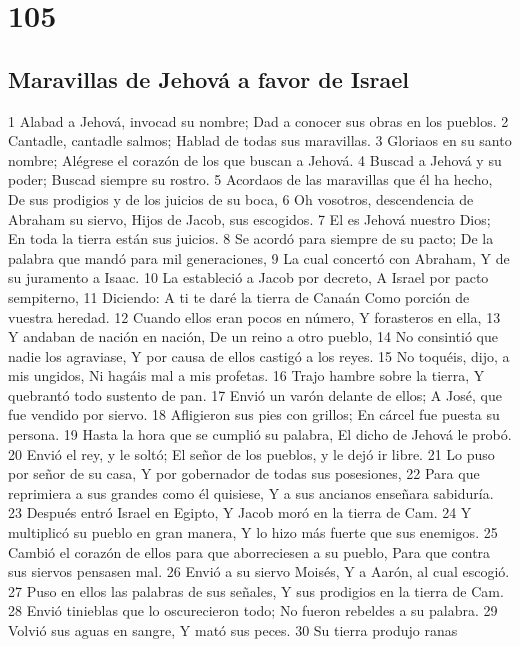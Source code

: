 \chapter{105}

\section*{Maravillas de Jehová a favor de Israel}

1 Alabad a Jehová, invocad su nombre;
Dad a conocer sus obras en los pueblos.
2 Cantadle, cantadle salmos;
Hablad de todas sus maravillas.
3 Gloriaos en su santo nombre;
Alégrese el corazón de los que buscan a Jehová.
4 Buscad a Jehová y su poder;
Buscad siempre su rostro.
5 Acordaos de las maravillas que él ha hecho,
De sus prodigios y de los juicios de su boca,
6 Oh vosotros, descendencia de Abraham su siervo,
Hijos de Jacob, sus escogidos.
7 El es Jehová nuestro Dios;
En toda la tierra están sus juicios.
8 Se acordó para siempre de su pacto;
De la palabra que mandó para mil generaciones,
9 La cual concertó con Abraham,
Y de su juramento a Isaac.
10 La estableció a Jacob por decreto,
A Israel por pacto sempiterno,
11 Diciendo: A ti te daré la tierra de Canaán
Como porción de vuestra heredad.
12 Cuando ellos eran pocos en número,
Y forasteros en ella,
13 Y andaban de nación en nación,
De un reino a otro pueblo,
14 No consintió que nadie los agraviase,
Y por causa de ellos castigó a los reyes.
15 No toquéis, dijo, a mis ungidos,
Ni hagáis mal a mis profetas.
16 Trajo hambre sobre la tierra,
Y quebrantó todo sustento de pan.
17 Envió un varón delante de ellos;
A José, que fue vendido por siervo.
18 Afligieron sus pies con grillos;
En cárcel fue puesta su persona.
19 Hasta la hora que se cumplió su palabra,
El dicho de Jehová le probó.
20 Envió el rey, y le soltó;
El señor de los pueblos, y le dejó ir libre.
21 Lo puso por señor de su casa,
Y por gobernador de todas sus posesiones,
22 Para que reprimiera a sus grandes como él quisiese,
Y a sus ancianos enseñara sabiduría.
23 Después entró Israel en Egipto,
Y Jacob moró en la tierra de Cam.
24 Y multiplicó su pueblo en gran manera,
Y lo hizo más fuerte que sus enemigos.
25 Cambió el corazón de ellos para que aborreciesen a su pueblo,
Para que contra sus siervos pensasen mal.
26 Envió a su siervo Moisés,
Y a Aarón, al cual escogió.
27 Puso en ellos las palabras de sus señales,
Y sus prodigios en la tierra de Cam.
28 Envió tinieblas que lo oscurecieron todo;
No fueron rebeldes a su palabra.
29 Volvió sus aguas en sangre,
Y mató sus peces.
30 Su tierra produjo ranas
